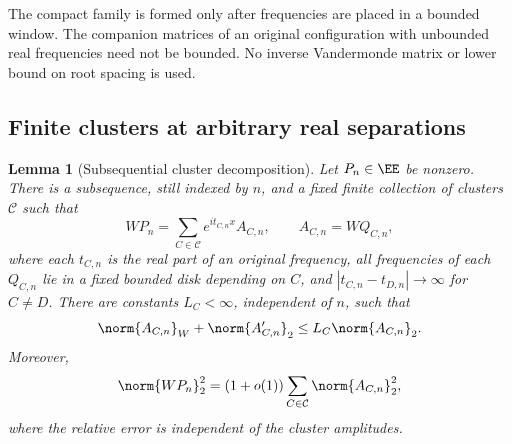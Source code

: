 \documentclass[11pt,a4paper]{article}
\numberwithin{equation}{section}
\newtheorem{lemma}[theorem]{Lemma}
\theoremstyle{definition}\newtheorem{definition}[theorem]{Definition}
\theoremstyle{remark}\newtheorem{remark}[theorem]{Remark}
\begin{document}
The compact family is formed only after frequencies are placed in a
bounded window. The companion matrices of an original configuration with
unbounded real frequencies need not be bounded. No inverse Vandermonde
matrix or lower bound on root spacing is used.

\subsection{Finite clusters at arbitrary real separations}\label{e:sec:clusters}

\begin{lemma}[Subsequential cluster decomposition]\label{e:lem:clusters}
Let $P_n\in\EE$ be nonzero. There is a subsequence, still indexed by $n$,
and a fixed finite collection of clusters $\mathcal C$ such that
\begin{equation}\label{e:eq:cluster}
 WP_n=\sum_{C\in\mathcal C}e^{it_{C,n}x}A_{C,n},\qquad
 A_{C,n}=WQ_{C,n},
\end{equation}
where each $t_{C,n}$ is the real part of an original frequency,
all frequencies of each $Q_{C,n}$ lie in a fixed bounded disk depending
on $C$, and $|t_{C,n}-t_{D,n}|\to\infty$ for $C\ne D$.
There are constants $L_C<\infty$, independent of $n$, such that
\begin{equation}\label{e:eq:cluster-envelope}
 \norm{A_{C,n}}_W+\norm{A_{C,n}'}_2\le L_C\norm{A_{C,n}}_2.
\end{equation}
Moreover,
\begin{equation}\label{e:eq:decouple}
 \norm{WP_n}_2^2=(1+o(1))
 \sum_{C\in\mathcal C}\norm{A_{C,n}}_2^2,
\end{equation}
where the relative error is independent of the cluster amplitudes.
\end{lemma}
\end{document}

